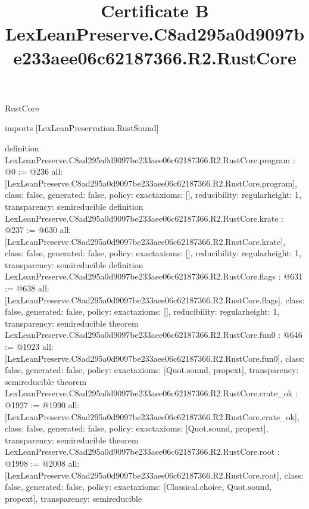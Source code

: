 \begin{lexlean}{RustCore}
\title{Certificate B LexLeanPreserve.C8ad295a0d9097be233aee06c62187366.R2.RustCore}
\begin{coremodule}
imports [LexLeanPreservation.RustSound]

definition LexLeanPreserve.C8ad295a0d9097be233aee06c62187366.R2.RustCore.program : @0 := @236 {
  all: [LexLeanPreserve.C8ad295a0d9097be233aee06c62187366.R2.RustCore.program],
  class: false,
  generated: false,
  policy: exact{axioms: []},
  reducibility: regular{height: 1},
  transparency: semireducible
}
definition LexLeanPreserve.C8ad295a0d9097be233aee06c62187366.R2.RustCore.krate : @237 := @630 {
  all: [LexLeanPreserve.C8ad295a0d9097be233aee06c62187366.R2.RustCore.krate],
  class: false,
  generated: false,
  policy: exact{axioms: []},
  reducibility: regular{height: 1},
  transparency: semireducible
}
definition LexLeanPreserve.C8ad295a0d9097be233aee06c62187366.R2.RustCore.flags : @631 := @638 {
  all: [LexLeanPreserve.C8ad295a0d9097be233aee06c62187366.R2.RustCore.flags],
  class: false,
  generated: false,
  policy: exact{axioms: []},
  reducibility: regular{height: 1},
  transparency: semireducible
}
theorem LexLeanPreserve.C8ad295a0d9097be233aee06c62187366.R2.RustCore.fun0 : @646 := @1923 {
  all: [LexLeanPreserve.C8ad295a0d9097be233aee06c62187366.R2.RustCore.fun0],
  class: false,
  generated: false,
  policy: exact{axioms: [Quot.sound, propext]},
  transparency: semireducible
}
theorem LexLeanPreserve.C8ad295a0d9097be233aee06c62187366.R2.RustCore.crate_ok : @1927 := @1990 {
  all: [LexLeanPreserve.C8ad295a0d9097be233aee06c62187366.R2.RustCore.crate_ok],
  class: false,
  generated: false,
  policy: exact{axioms: [Quot.sound, propext]},
  transparency: semireducible
}
theorem LexLeanPreserve.C8ad295a0d9097be233aee06c62187366.R2.RustCore.root : @1998 := @2008 {
  all: [LexLeanPreserve.C8ad295a0d9097be233aee06c62187366.R2.RustCore.root],
  class: false,
  generated: false,
  policy: exact{axioms: [Classical.choice, Quot.sound, propext]},
  transparency: semireducible
}


\end{coremodule}
\end{lexlean}
